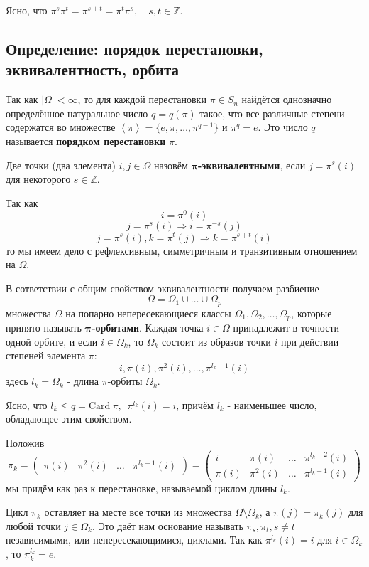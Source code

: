 \documentclass{article}
\begin{document}
Ясно, что $\pi^s \pi^t = \pi^{s+t} = \pi^t \pi^s, \quad s, t \in \mathbb{Z}$.

\subsection{Определение: порядок перестановки, эквивалентность, орбита}

Так как $|\Omega| < \infty$, то для каждой перестановки $\pi \in S_n$ найдётся однозначно определённое натуральное число $q = q(\pi)$ такое, что все различные степени содержатся во множестве $\left<\pi\right> = \{e, \pi, \dots, \pi^{q-1}\}$ и $\pi^q = e$. Это число $q$ называется \textbf{порядком перестановки} $\pi$.

Две точки (два элемента) $i, j \in \Omega$ назовём $\mathbf{\pi}$\textbf{-эквивалентными}, если $j = \pi^s(i)$ для некоторого $s \in \mathbb{Z}$.

Так как \[i = \pi^0(i)\]
\[j = \pi^s(i) \Rightarrow i = \pi^{-s}(j)\]
\[j = \pi^s(i), k = \pi^t(j) \Rightarrow k = \pi^{s+t}(i)\]
то мы имеем дело с рефлексивным, симметричным и транзитивным отношением на $\Omega$.

В сответствии с общим свойством эквивалентности получаем разбиение \begin{equation}
\label{eq:6_1}
\Omega = \Omega_1 \cup \dots \cup \Omega_p
\end{equation} множества $\Omega$ на попарно непересекающиеся классы $\Omega_1, \Omega_2, \dots, \Omega_p$, которые принято называть $\mathbf{\pi}$\textbf{-орбитами}. Каждая точка $i \in \Omega$ принадлежит в точности одной орбите, и если $i \in \Omega_k$, то $\Omega_k$ состоит из образов точки $i$ при действии степеней элемента $\pi$: 
\[i, \pi(i), \pi^2(i), \dots, \pi^{l_k-1}(i)\]
здесь $l_k = \Omega_k$ - длина $\pi$-орбиты $\Omega_k$.

Ясно, что $l_k \leq q = \mathrm{Card}~\pi, \enspace \pi^{l_k}(i) = i$, причём $l_k$ - наименьшее число, обладающее этим свойством.

Положив
\[\pi_k = (\begin{matrix}\pi(i) &\pi^2(i) &\dots &\pi^{l_k-1}(i)\end{matrix}) = \left(\begin{matrix}
i &\pi(i) &\dots &\pi^{l_k-2}(i) \\
\pi(i) &\pi^2(i) &\dots &\pi^{l_k-1}(i)
\end{matrix}\right)\]
мы придём как раз к перестановке, называемой циклом длины $l_k$.

Цикл $\pi_k$ оставляет на месте все точки из множества $\Omega \setminus \Omega_k$, а $\pi(j) = \pi_k(j)$ для любой точки $j \in \Omega_k$. Это даёт нам основание называть $\pi_s, \pi_t, s \neq t$ независимыми, или непересекающимися, циклами. Так как $\pi^{l_k}(i) = i$ для $i \in \Omega_k$, то $\pi_k^{l_k} = e$.
\end{document}
